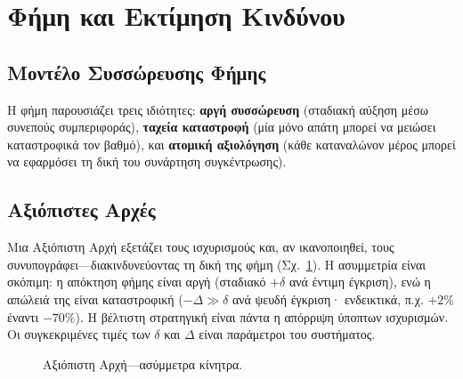 \documentclass[11pt,a4paper,twocolumn]{article}
\begin{document}
\section{Φήμη και Εκτίμηση Κινδύνου}

\subsection{Μοντέλο Συσσώρευσης Φήμης}

Η φήμη παρουσιάζει τρεις ιδιότητες: \textbf{αργή συσσώρευση} (σταδιακή αύξηση μέσω συνεπούς συμπεριφοράς), \textbf{ταχεία καταστροφή} (μία μόνο απάτη μπορεί να μειώσει καταστροφικά τον βαθμό), και \textbf{ατομική αξιολόγηση} (κάθε καταναλώνον μέρος μπορεί να εφαρμόσει τη δική του συνάρτηση συγκέντρωσης).

\subsection{Αξιόπιστες Αρχές}

Μια Αξιόπιστη Αρχή εξετάζει τους ισχυρισμούς και, αν ικανοποιηθεί, τους συνυπογράφει---διακινδυνεύοντας τη δική της φήμη (Σχ.~\ref{fig:authority}). Η ασυμμετρία είναι σκόπιμη: η απόκτηση φήμης είναι αργή (σταδιακό $+\delta$ ανά έντιμη έγκριση), ενώ η απώλειά της είναι καταστροφική ($-\Delta \gg \delta$ ανά ψευδή έγκριση· ενδεικτικά, π.χ. $+2\%$ έναντι $-70\%$). Η βέλτιστη στρατηγική είναι πάντα η απόρριψη ύποπτων ισχυρισμών. Οι συγκεκριμένες τιμές των $\delta$ και $\Delta$ είναι παράμετροι του συστήματος.

\begin{figure}[ht]
\centering
{}
\caption{Αξιόπιστη Αρχή---ασύμμετρα κίνητρα.}
\label{fig:authority}
\end{figure}
\end{document}

